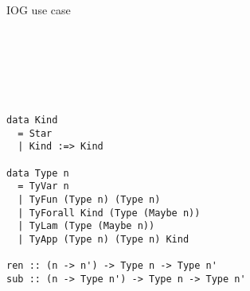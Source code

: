 \documentclass[aspectratio=169]{beamer}
\begin{document}
\begin{frame}[fragile]{IOG use case}
\begin{minipage}{.54\textwidth}
\begin{code}
\AgdaSpace{}%
\AgdaSpace{}%
\<%
\\
\>[2][@{}l@{\AgdaIndent{0}}]%
\>[4]\AgdaSpace{}%
\AgdaSpace{}%
\<%
\\
\>[0]\AgdaSpace{}%
\AgdaSymbol{:}\AgdaSpace{}%
\AgdaSymbol{(}\AgdaSpace{}%
\AgdaSpace{}%
\AgdaSpace{}%
\AgdaSymbol{)}\AgdaSpace{}%
\AgdaSpace{}%
\AgdaSpace{}%
\AgdaSpace{}%
\AgdaSpace{}%
\AgdaSpace{}%
\<%
\\
\>[0]\AgdaSpace{}%
\AgdaSymbol{:}\AgdaSpace{}%
\AgdaSymbol{(}\AgdaSpace{}%
\AgdaSpace{}%
\AgdaSpace{}%
\AgdaSpace{}%
\AgdaSymbol{)}\AgdaSpace{}%
\AgdaSpace{}%
\AgdaSpace{}%
\AgdaSpace{}%
\AgdaSpace{}%
\AgdaSpace{}%
\<%
\end{code}
\begin{code}[hide]%
\>[0]\AgdaSymbol{\{-\#}\AgdaSpace{}%
\AgdaSpace{}%
\AgdaSpace{}%
\AgdaSpace{}%
\AgdaSymbol{\#-\}}\<%
\\
\>[0]\AgdaSymbol{\{-\#}\AgdaSpace{}%
\AgdaSpace{}%
\AgdaSpace{}%
\AgdaSpace{}%
\AgdaSymbol{\#-\}}\<%
\end{code}
\end{minipage}\hspace{-.75cm}\vrule\hspace{.2cm}
\begin{minipage}{.45\textwidth}
\begin{verbatim}
data Kind
  = Star
  | Kind :=> Kind

data Type n
  = TyVar n
  | TyFun (Type n) (Type n)
  | TyForall Kind (Type (Maybe n))
  | TyLam (Type (Maybe n))
  | TyApp (Type n) (Type n) Kind

ren :: (n -> n') -> Type n -> Type n'
sub :: (n -> Type n') -> Type n -> Type n'
\end{verbatim}
\end{minipage}

\end{frame}
\end{document}
